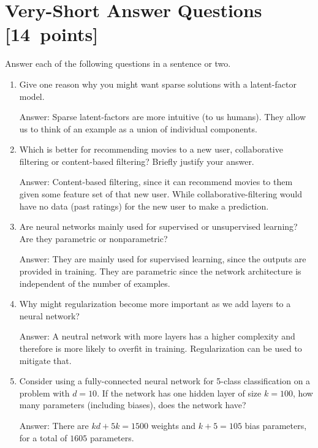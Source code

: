 \documentclass{article}
\newcommand{\blu}[1]{{\textcolor{blu}{#1}}}
\newenvironment{answer}{\par\begingroup\color{gre}Answer: }{\endgroup}
\let\ask\blu
\newcommand\pts[1]{\textcolor{pointscolour}{[#1~points]}}
\begin{document}
\section{Very-Short Answer Questions \pts{14}}

\ask{Answer each of the following questions in a sentence or two.}
\begin{enumerate}

\item Give one reason why you might want sparse solutions with a latent-factor model.
\begin{answer}
    Sparse latent-factors are more intuitive (to us humans). They allow us to think of an example as a union of individual components.
\end{answer}

\item Which is better for recommending movies to a new user, collaborative filtering or content-based filtering? Briefly justify your answer.
\begin{answer}
    Content-based filtering, since it can recommend movies to them given some feature set of that new user. While collaborative-filtering would have no data (past ratings) for the new user to make a prediction.
\end{answer}


\item{Are neural networks mainly used for supervised or unsupervised learning? Are they parametric or nonparametric?}
\begin{answer}
    They are mainly used for supervised learning, since the outputs are provided in training. They are parametric since the network architecture is independent of the number of examples.
\end{answer}

\item{Why might regularization become more important as we add layers to a neural network?}
\begin{answer}
    A neutral network with more layers has a higher complexity and therefore is more likely to overfit in training. Regularization can be used to mitigate that.
\end{answer}


\item{Consider using a fully-connected neural network for 5-class classification on a problem with $d=10$. If the network has one hidden layer of size $k=100$, how many parameters (including biases), does the network have?}
\begin{answer}
    There are $kd + 5k = 1500$ weights and $k + 5 = 105$ bias parameters, for a total of $1605$ parameters.
\end{answer}


\end{enumerate}
\end{document}
